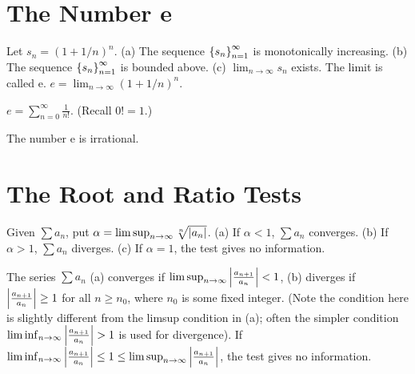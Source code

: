 \section{The Number e}
\label{sec:chap3:number_e}

\begin{theorem} %
  \label{thm:chap3:e_definition}
  Let $s_n = (1 + 1/n)^n$.
  (a) The sequence $\left\{ s_n \right\}_{n=1}^\infty$ is monotonically increasing.
  (b) The sequence $\left\{ s_n \right\}_{n=1}^\infty$ is bounded above.
  (c) $\lim_{n \to \infty} s_n$ exists.
  The limit is called e.
  $e = \lim_{n \to \infty} (1 + 1/n)^n$.
\end{theorem}

\begin{theorem} %
  \label{thm:chap3:e_series}
  $e = \sum_{n=0}^\infty \frac{1}{n!}$.
  (Recall $0! = 1$.)
\end{theorem}

\begin{theorem}[e is Irrational] %
  \label{thm:chap3:e_irrational}
  The number e is irrational.
\end{theorem}

\section{The Root and Ratio Tests}
\label{sec:chap3:root_ratio_tests}

\begin{theorem} %
  \label{thm:chap3:root_test}
  Given $\sum a_n$, put $\alpha = \limsup_{n \to \infty} \sqrt[n]{\left\lvert a_n \right\rvert}$.
  (a) If $\alpha < 1$, $\sum a_n$ converges.
  (b) If $\alpha > 1$, $\sum a_n$ diverges.
  (c) If $\alpha = 1$, the test gives no information.
\end{theorem}

\begin{theorem} %
  \label{thm:chap3:ratio_test}
  The series $\sum a_n$
  (a) converges if $\limsup_{n \to \infty} \left\lvert \frac{a_{n+1}}{a_n} \right\rvert < 1$,
  (b) diverges if $\left\lvert \frac{a_{n+1}}{a_n} \right\rvert \ge 1$ for all $n \ge
  n_0$, where $n_0$ is some fixed integer. (Note the condition here
    is slightly different from the limsup condition in (a); often the
    simpler condition $\liminf_{n \to \infty} \left\lvert \frac{a_{n+1}}{a_n} \right\rvert
  > 1$ is used for divergence).
  If $\liminf_{n \to \infty} \left\lvert \frac{a_{n+1}}{a_n} \right\rvert \le 1 \le
  \limsup_{n \to \infty} \left\lvert \frac{a_{n+1}}{a_n} \right\rvert$, the test gives
  no information.
\end{theorem}

